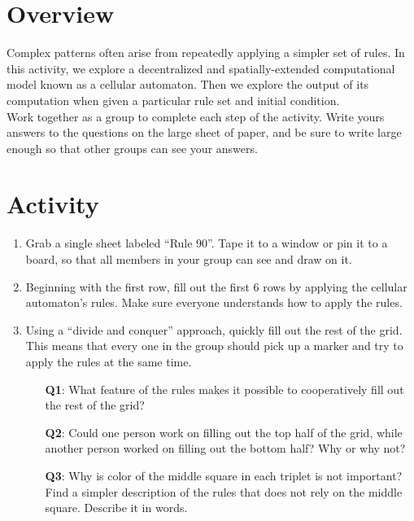 \documentclass{article}
\begin{document}
\section*{Overview}

Complex patterns often arise from repeatedly applying a simpler set of rules.
In this activity, we explore a decentralized and spatially-extended computational model known as a cellular automaton. Then we explore the output of its computation when given a particular rule set and initial condition.\\

\noindent Work together as a group to complete each step of the activity. Write yours answers to the questions on the large sheet of paper, and be sure to write large enough so that other groups can see your answers.

\section*{Activity}

\begin{enumerate}
	\item Grab a single sheet labeled ``Rule 90''. Tape it to a window or pin
	it to a board, so that all members in your group can see and draw on it.

	\item Beginning with the first row, fill out the first $6$ rows by applying
	the cellular automaton's rules. Make sure everyone understands how to
	apply the rules.

	\item Using a ``divide and conquer'' approach, quickly fill out the rest
	of the grid. This means that every one in the group should pick up a marker
	and try to apply the rules at the same time.

		\begin{itemize}
		\item[\textbf{Q1}:] What feature of the rules makes it possible to cooperatively
		fill out the rest of the grid?

		\item[\textbf{Q2}:] Could one person work on filling out the top half of the grid,
		while another person worked on filling out the bottom half?
		Why or why not?

		\item[\textbf{Q3}:] Why is color of the middle square in each triplet
  is not important? Find a simpler description of the rules that does not rely on
  the middle square. Describe it in words.

		\end{itemize}

\end{enumerate}
\end{document}
